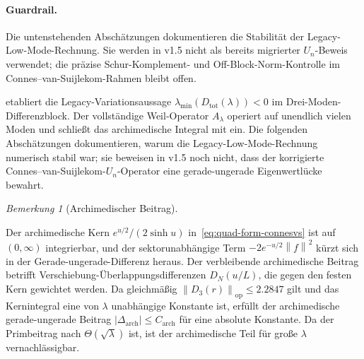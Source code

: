 \documentclass[11pt,a4paper]{article}
\theoremstyle{remark}
\newtheorem{remark}[remark]{Bemerkung}
\theoremstyle{plain}
\newcommand{\norm}[1]{\left\lVert #1 \right\rVert}
\begin{document}
\paragraph{Guardrail.}  Die untenstehenden Abschätzungen dokumentieren die
Stabilität der Legacy-Low-Mode-Rechnung. Sie werden in v1.5 nicht als bereits
migrierter $U_n$-Beweis verwendet; die präzise Schur-Komplement- und
Off-Block-Norm-Kontrolle im Connes--van-Suijlekom-Rahmen bleibt offen.

\bigskip

 etabliert die Legacy-Variationsaussage $\lambda_{\min}(D_{\mathrm{tot}}(\lambda))<0$ im Drei-Moden-Differenzblock. Der vollständige Weil-Operator $A_\lambda$ operiert auf unendlich vielen Moden und schließt das archimedische Integral mit ein. Die folgenden Abschätzungen dokumentieren, warum die Legacy-Low-Mode-Rechnung numerisch stabil war; sie beweisen in v1.5 noch nicht, dass der korrigierte Connes--van-Suijlekom-$U_n$-Operator eine gerade-ungerade Eigenwertlücke bewahrt.

\begin{remark}[Archimedischer Beitrag]
\label{rem:archimedean}
\begin{sloppypar}
Der archimedische Kern $e^{u/2}/(2\sinh u)$ in~\eqref{eq:quad-form-connesvs} ist auf $(0,\infty)$ integrierbar, und der sektorunabhängige Term $-2e^{-u/2}\norm{f}^2$ kürzt sich in der Gerade-ungerade-Differenz heraus. Der verbleibende archimedische Beitrag betrifft Verschiebung-Über\-lap\-pungs\-dif\-fe\-ren\-zen $D_N(u/L)$, die gegen den festen Kern gewichtet werden. Da gleichmäßig $\norm{D_3(r)}_{\mathrm{op}}\leq 2.2847$ gilt und das Kernintegral eine von $\lambda$ unabhängige Konstante ist, erfüllt der archimedische gerade-ungerade Beitrag $|\Delta_{\mathrm{arch}}|\leq C_{\mathrm{arch}}$ für eine absolute Konstante. Da der Primbeitrag nach  $\Theta(\sqrt\lambda)$ ist, ist der archimedische Teil für große $\lambda$ vernachlässigbar.
\end{sloppypar}
\end{remark}
\end{document}
